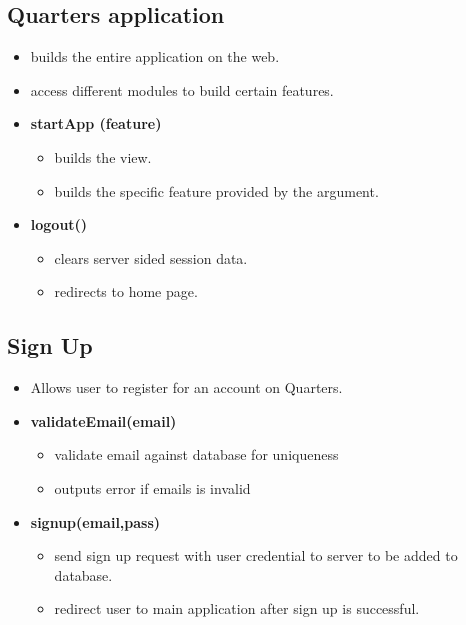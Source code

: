 \documentclass[12pt]{article}
\begin{document}
\subsection{Quarters application}
\begin{itemize}
    \item builds the entire application on the web.
    \item access different modules to build certain features.
    \item \textbf{startApp (feature)}
    \begin{itemize}
        \item builds the view.
        \item builds the specific feature provided by the argument.
    \end{itemize}
        \item \textbf{logout()}
    \begin{itemize}
        \item clears server sided session data.
        \item redirects to home page.
    \end{itemize}
\end{itemize}


\subsection{Sign Up}

\begin{itemize}
    \item Allows user to register for an account on Quarters.
    
    \item \textbf{validateEmail(email)}
    \begin{itemize}
        \item validate email against database for uniqueness
        \item outputs error if emails is invalid
    \end{itemize}
    \item \textbf{signup(email,pass)}
    \begin{itemize}
        \item send sign up request with user credential to server to be added to database.
        \item redirect user to main application after sign up is successful.
    \end{itemize}
\end{itemize}
\end{document}
